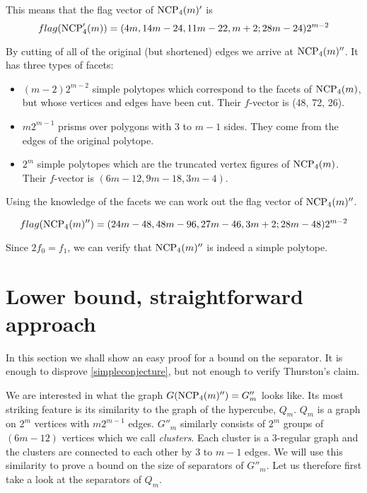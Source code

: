 This means that the flag vector of $\textrm{NCP}_4(m)'$ is 
\begin{equation}
 flag(\textrm{NCP}'_4(m)) = (4m, 14m-24, 11m-22, m+2; 28m-24)2^{m-2}
\end{equation}

By cutting of all of the original (but shortened) edges we arrive at 
$\textrm{NCP}_4(m)''$. It has three types of facets:

\begin{itemize}
 \item $(m-2)2^{m-2}$ simple polytopes which correspond to the facets of 
$\textrm{NCP}_4(m)$, but whose vertices and edges have been cut. Their $f$-vector is 
(48, 72, 26).
\item $m2^{m-1}$ prisms over polygons with $3$ to $m-1$ sides. They come from 
the edges of the original polytope.
\item $2^m$ simple polytopes which are the truncated vertex figures of 
$\textrm{NCP}_4(m)$. Their $f$-vector is $(6m - 12, 9m-18, 3m-4)$.
\end{itemize}

Using the knowledge of the facets we can work out the flag vector of 
$\textrm{NCP}_4(m)''$.

\begin{equation}
 flag(\textrm{NCP}_4(m)'') = (24m-48, 48m-96, 27m - 46, 3m+2; 28m -48)2^{m-2}
\end{equation}

Since $2f_0 = f_1$, we can verify that $\textrm{NCP}_4(m)''$ is indeed a simple 
polytope.

\section{Lower bound, straightforward approach}

In this section we shall show an easy proof for a bound on the separator. It
is enough to disprove \ref{simpleconjecture}, but not enough to verify Thurston's
claim.

We are interested in what the graph $G(\textrm{NCP}_4(m)'') = G''_m$ looks like. Its 
most striking feature is its similarity to the graph of the hypercube, $Q_m$. 
$Q_m$ is a graph on $2^m$ vertices with $m2^{m-1}$ edges. $G''_m$ 
similarly consists of $2^m$ groups of $(6m-12)$ vertices which we call 
\textit{clusters}. Each cluster is a 3-regular graph and the clusters are 
connected to each other by 3 to $m-1$ edges. We will use this similarity to 
prove a bound on the size of separators of $G''_m$. Let us therefore first take a 
look at the separators of $Q_m$.


